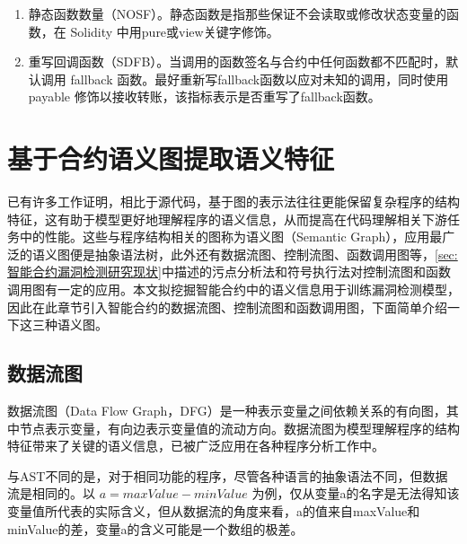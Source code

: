 \begin{enumerate}[label=(\arabic*)]
    \item 静态函数数量（NOSF）。静态函数是指那些保证不会读取或修改状态变量的函数，在 Solidity 中用pure或view关键字修饰。
    \item 重写回调函数（SDFB）。当调用的函数签名与合约中任何函数都不匹配时，默认调用 fallback 函数。最好重新写fallback函数以应对未知的调用，同时使用 payable 修饰以接收转账，该指标表示是否重写了fallback函数。
\end{enumerate}

\section{基于合约语义图提取语义特征}
\label{sec:基于合约语义图提取语义特征}

已有许多工作证明，相比于源代码，基于图的表示法往往更能保留复杂程序的结构特征\cite{allamanis2017learning}，这有助于模型更好地理解程序的语义信息，从而提高在代码理解相关下游任务中的性能。这些与程序结构相关的图称为语义图（Semantic Graph），应用最广泛的语义图便是抽象语法树，此外还有数据流图、控制流图、函数调用图等，\autoref{sec:智能合约漏洞检测研究现状}中描述的污点分析法和符号执行法对控制流图和函数调用图有一定的应用。本文拟挖掘智能合约中的语义信息用于训练漏洞检测模型，因此在此章节引入智能合约的数据流图、控制流图和函数调用图，下面简单介绍一下这三种语义图。

\subsection{数据流图}
\label{sec:数据流图}
数据流图（Data Flow Graph，DFG）是一种表示变量之间依赖关系的有向图，其中节点表示变量，有向边表示变量值的流动方向。数据流图为模型理解程序的结构特征带来了关键的语义信息，已被广泛应用在各种程序分析工作中\cite{hellendoorn2019global,allamanis2018learning,guo2020graphcodebert}。

与AST不同的是，对于相同功能的程序，尽管各种语言的抽象语法不同，但数据流是相同的。以 $a=maxValue-minValue$ 为例，仅从变量a的名字是无法得知该变量值所代表的实际含义，但从数据流的角度来看，a的值来自maxValue和minValue的差，变量a的含义可能是一个数组的极差。

